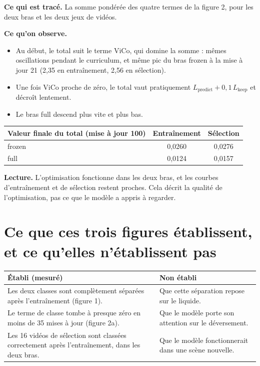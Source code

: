 \documentclass[11pt,a4paper]{article}
\newcommand{\lecture}[1]{\textbf{Lecture.} #1}
\begin{document}
\textbf{Ce qui est tracé.} La somme pondérée des quatre termes de la figure 2, pour les deux bras et
les deux jeux de vidéos.

\textbf{Ce qu'on observe.}
\begin{itemize}\itemsep1pt
\item Au début, le total suit le terme ViCo, qui domine la somme : mêmes oscillations pendant le
      curriculum, et même pic du bras frozen à la mise à jour 21 (2,35 en entraînement, 2,56 en sélection).
\item Une fois ViCo proche de zéro, le total vaut pratiquement
      $L_{\text{predict}} + 0{,}1\,L_{\text{keep}}$ et décroît lentement.
\item Le bras full descend plus vite et plus bas.
\end{itemize}

\begin{center}\small
\begin{tabular}{lcc}\toprule
Valeur finale du total (mise à jour 100) & Entraînement & Sélection\\\midrule
frozen & 0,0260 & 0,0276\\
full   & 0,0124 & 0,0157\\\bottomrule
\end{tabular}
\end{center}

\lecture{L'optimisation fonctionne dans les deux bras, et les courbes d'entraînement et de sélection
restent proches. Cela décrit la qualité de l'optimisation, pas ce que le modèle a appris à regarder.}

\section*{Ce que ces trois figures établissent, et ce qu'elles n'établissent pas}

\begin{tabular}{p{.47\linewidth}p{.47\linewidth}}\toprule
\textbf{Établi (mesuré)} & \textbf{Non établi}\\\midrule
Les deux classes sont complètement séparées après l'entraînement (figure 1). &
Que cette séparation repose sur le liquide.\\[3pt]
Le terme de classe tombe à presque zéro en moins de 35 mises à jour (figure 2a). &
Que le modèle porte son attention sur le déversement.\\[3pt]
Les 16 vidéos de sélection sont classées correctement après l'entraînement, dans les deux bras. &
Que le modèle fonctionnerait dans une scène nouvelle.\\\bottomrule
\end{tabular}
\end{document}
